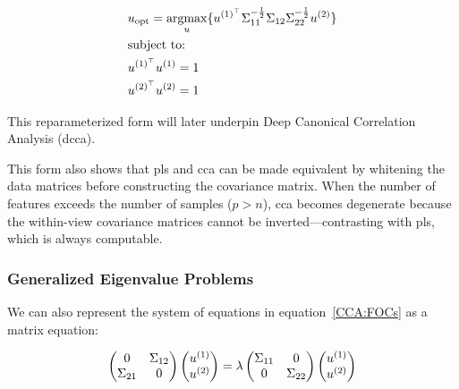 \begin{align}
     & u_{\text{opt}}=\underset{u}{\mathrm{argmax}}\{ u^{(1)^{\top}}\Sigma_{11}^{-\frac{1}{2}}\Sigma_{12}\Sigma_{22}^{-\frac{1}{2}}u^{(2)} \} \\
     & \text{subject to:} \notag                                                                                                            \\
     & u^{(1)^{\top}}u^{(1)}=1 \notag                                                                                                         \\
     & u^{(2)^{\top}}u^{(2)}=1 \notag
\end{align}

This reparameterized form will later underpin Deep Canonical Correlation Analysis (\acrshort{dcca}).

This form also shows that \acrshort{pls} and \acrshort{cca} can be made equivalent by whitening the data matrices before constructing the covariance matrix. When the number of features exceeds the number of samples (\(p>n\)), \acrshort{cca} becomes degenerate because the within-view covariance matrices cannot be inverted—contrasting with \acrshort{pls}, which is always computable.

\subsubsection{Generalized Eigenvalue Problems}

We can also represent the system of equations in equation~\ref{CCA:FOCs} as a matrix equation:

\begin{align}
    \begin{pmatrix}
        0           & \Sigma_{12} \\
        \Sigma_{21} & 0
    \end{pmatrix}
    \begin{pmatrix}
        u^{(1)} \\
        u^{(2)}
    \end{pmatrix}
    =
    \lambda
    \begin{pmatrix}
        \Sigma_{11} & 0           \\
        0           & \Sigma_{22}
    \end{pmatrix}
    \begin{pmatrix}
        u^{(1)} \\
        u^{(2)}
    \end{pmatrix}
\end{align}

